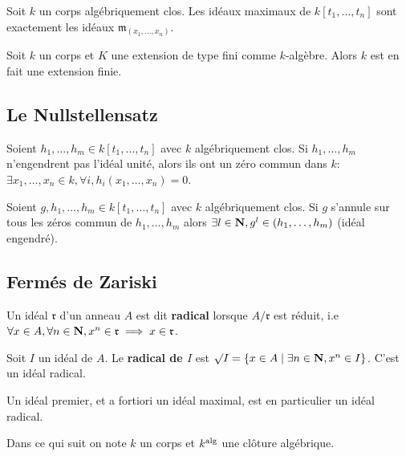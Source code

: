 	\begin{pop}
		Soit $k$ un corps algébriquement clos.
		Les idéaux maximaux de $k[t_1,\ldots,t_n]$ sont exactement les idéaux $\mathfrak{m}_{(x_1,\ldots,x_n)}$.
	\end{pop}
	
	\begin{pop}
		Soit $k$ un corps et $K$ une extension de type fini comme $k$-algèbre.
		Alors $k$ est en fait une extension finie.
	\end{pop}


\subsection{Le Nullstellensatz}

	\begin{pop}
		Soient $h_1,\ldots,h_m \in k[t_1,\ldots,t_n]$ avec $k$ algébriquement clos.
		Si $h_1,\ldots,h_m$ n'engendrent pas l'idéal unité, alors ils ont un zéro commun dans $k$: $\exists x_1,\ldots,x_n \in k, \forall i, h_i(x_1,\ldots,x_n) = 0$.
	\end{pop}

	\begin{pop}
		Soient $g, h_1,\ldots,h_m \in k[t_1,\ldots,t_n]$ avec $k$ algébriquement clos.
		Si $g$ s'annule sur tous les zéros commun de $h_1,\ldots,h_m$ alors $\exists l \in \mathbf{N}, g^l \in (h_1,\ldots,h_m)$ (idéal engendré).
	\end{pop}


\subsection{Fermés de Zariski}

	\begin{defn}
		Un idéal $\mathfrak{r}$ d'un anneau $A$ est dit \textbf{radical} lorsque $A / \mathfrak{r}$ est réduit, i.e $\forall x \in A, \forall n \in \mathbf{N}, x^n \in \mathfrak{r} \implies x \in \mathfrak{r}$.
	\end{defn}
	
	\begin{defn}
		Soit $I$ un idéal de $A$.
		Le \textbf{radical de $I$} est $\surd I = \{ x \in A \mid \exists n \in \mathbf{N}, x^n \in I \}$.
		C'est un idéal radical.
	\end{defn}

	Un idéal premier, et a fortiori un idéal maximal, est en particulier un idéal radical.

	Dans ce qui suit on note $k$ un corps et $k^{\operatorname{alg}}$ une clôture algébrique.

